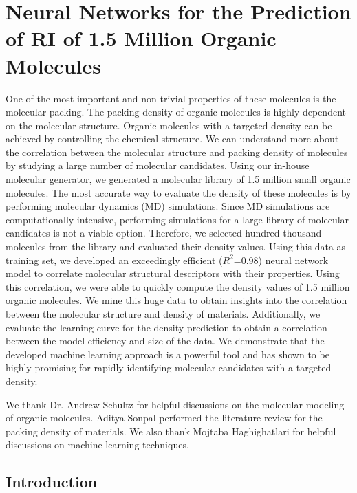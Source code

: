 \chapter{Neural Networks for the Prediction of RI of 1.5 Million Organic Molecules}

One of the most important and non-trivial properties of these molecules is the molecular packing. The packing density of organic molecules is highly dependent on the molecular structure. Organic molecules with a targeted density can be achieved by controlling the chemical structure. We can understand more about the correlation between the molecular structure and packing density of molecules by studying a large number of molecular candidates. Using our in-house molecular generator, we generated a molecular library of 1.5 million small organic molecules. The most accurate way to evaluate the density of these molecules is by performing molecular dynamics (MD) simulations. Since MD simulations are computationally intensive, performing simulations for a large library of molecular candidates is not a viable option. Therefore, we selected hundred thousand molecules from the library and evaluated their density values. Using this data as training set, we developed an exceedingly efficient ($R^2$=0.98) neural network model to correlate molecular structural descriptors with their properties. Using this correlation, we were able to quickly compute the density values of 1.5 million organic molecules. We mine this huge data to obtain insights into the correlation between the molecular structure and density of materials. Additionally, we evaluate the learning curve for the density prediction to obtain a correlation between the model efficiency and size of the data. We demonstrate that the developed machine learning approach is a powerful tool and has shown to be highly promising for rapidly identifying molecular candidates with a targeted density. 
 
We thank Dr. Andrew Schultz for helpful discussions on the molecular modeling of organic molecules. Aditya Sonpal performed the literature review for the packing density of materials. We also thank Mojtaba Haghighatlari for helpful discussions on machine learning techniques. 

\section{Introduction}
\label{sec:introduction6}

